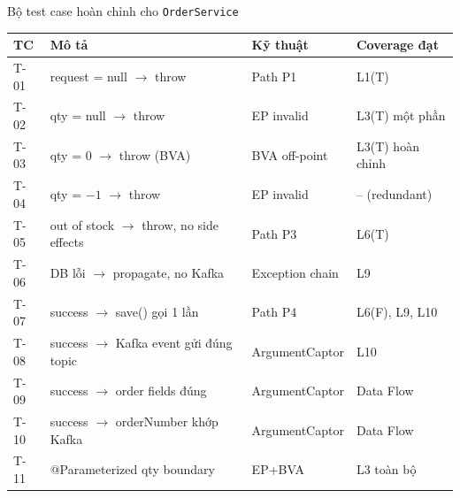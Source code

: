 \documentclass[aspectratio=169,10pt]{beamer}
\begin{document}
\begin{frame}[fragile,shrink=18]{Bộ test case hoàn chỉnh cho \texttt{OrderService}}
  \begin{center}
  \small
  \begin{tabular}{p{2.4cm}p{6.6cm}p{4.0cm}p{3.0cm}}
    \toprule
    \textbf{TC} & \textbf{Mô tả} & \textbf{Kỹ thuật} & \textbf{Coverage đạt} \\
    \midrule
    T-01 & request = null $\to$ throw & Path P1 & L1(T) \\
    T-02 & qty = null $\to$ throw & EP invalid & L3(T) một phần \\
    T-03 & qty = 0 $\to$ throw (BVA) & BVA off-point & L3(T) hoàn chỉnh \\
    T-04 & qty = $-1$ $\to$ throw & EP invalid & -- (redundant) \\
    T-05 & out of stock $\to$ throw, no side effects & Path P3 & L6(T) \\
    T-06 & DB lỗi $\to$ propagate, no Kafka & Exception chain & L9 \\
    T-07 & success $\to$ save() gọi 1 lần & Path P4 & L6(F), L9, L10 \\
    T-08 & success $\to$ Kafka event gửi đúng topic & ArgumentCaptor & L10 \\
    T-09 & success $\to$ order fields đúng & ArgumentCaptor & Data Flow \\
    T-10 & success $\to$ orderNumber khớp Kafka & ArgumentCaptor & Data Flow \\
    T-11 & @Parameterized qty boundary & EP+BVA & L3 toàn bộ \\
    \bottomrule
  \end{tabular}
  \end{center}
\end{frame}
\end{document}

